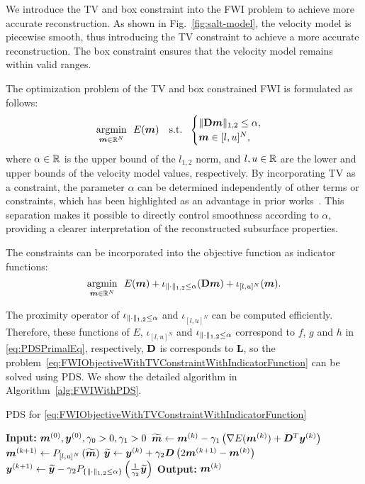 We introduce the TV and box constraint into the FWI problem to achieve more accurate reconstruction.
As shown in Fig.~\ref{fig:salt-model}, the velocity model is piecewise smooth, thus introducing the TV constraint to achieve a more accurate reconstruction.
The box constraint ensures that the velocity model remains within valid ranges.

The optimization problem of the TV and box constrained FWI is formulated as follows:
\begin{equation} \label{eq:FWIObjectiveWithTVConstraint} \argmin{\velModel \in \realNumber^N} \ \ \FWIObjectiveWithTVConstraint \end{equation}
where $\alpha \in \mathbb{R}$ is the upper bound of the $l_{1,2}$ norm, and $l, u \in \mathbb{R}$ are the lower and upper bounds of the velocity model values, respectively.
By incorporating TV as a constraint, the parameter $\alpha$ can be determined independently of other terms or constraints, which has been highlighted as an advantage in prior works~\cite{constraint0,constraint1,constraint2,constraint3,constraint4,constraints-vs-penalties-in-FWI}.
This separation makes it possible to directly control smoothness according to $\alpha$, providing a clearer interpretation of the reconstructed subsurface properties.

The constraints can be incorporated into the objective function as indicator functions:
\begin{equation} \label{eq:FWIObjectiveWithTVConstraintWithIndicatorFunction} \argmin{\velModel \in \realNumber^N} \ \ \FWIObjectiveWithTVConstraintWithIndicatorFunction. \end{equation}

The proximity operator of $\iota_{\lVert \cdot \rVert _{1,2} \le \alpha}$ and $\iota_{[l,u]^N}$ can be computed efficiently.
Therefore, these functions of $E$, $\iota_{[l,u]^N}$ and $\iota_{\lVert \cdot \rVert _{1,2} \le \alpha}$ correspond to $f$, $g$ and $h$ in \eqref{eq:PDSPrimalEq}, respectively, $\mathbf{D}$ is corresponds to $\bm{L}$, so the problem~\eqref{eq:FWIObjectiveWithTVConstraintWithIndicatorFunction} can be solved using PDS.
We show the detailed algorithm in Algorithm~\ref{alg:FWIWithPDS}.
\begin{algorithm}[t]
    \caption{PDS for \eqref{eq:FWIObjectiveWithTVConstraintWithIndicatorFunction}}\label{alg:FWIWithPDS}
    \begin{algorithmic}[1]
        \Statex \textbf{Input:} $ \bm{m}^{(0)}, \bm{y}^{(0)}, \gamma_0 > 0, \gamma_1 > 0 $
            \State $\widetilde{\bm{m}} \leftarrow \bm{m}^{(k)} - \gamma_1 \left( \nabla E(\bm{m}^{(k)}) + \bm{D}^T \bm{y}^{(k)} \right) $
            \State $\bm{m}^{(k+1)}     \leftarrow P_{[l,u]^N} \left( \widetilde{\bm{m}} \right) $
            \State $\widetilde{\bm{y}}     \leftarrow \bm{y}^{(k)} + \gamma_2 \bm{D} \left( 2\bm{m}^{(k+1)} - \bm{m}^{(k)} \right) $
            \State $\bm{y}^{(k+1)}         \leftarrow \widetilde{\bm{y}} - \gamma_2 P_{ \{ \lVert  \cdot  \rVert _{1,2} \le \alpha \} }\left(\frac 1 {\gamma_2} {\widetilde{\bm y}}\right) $
        \EndWhile
        \Statex \textbf{Output:} $\bm{m}^{(k)}$
    \end{algorithmic}
\end{algorithm}


